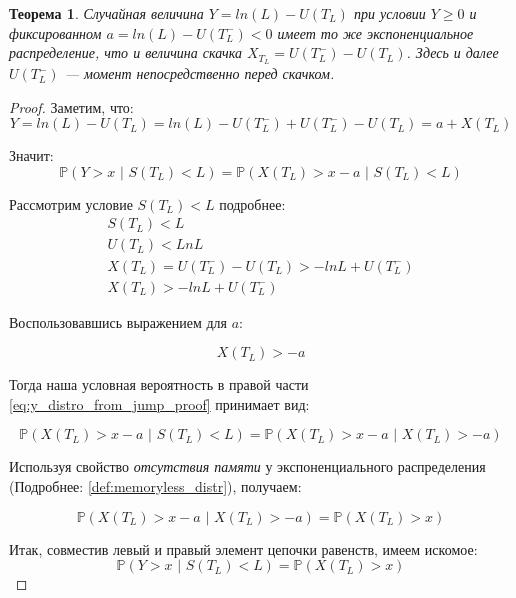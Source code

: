 \documentclass[a4paper,12pt]{article}
\newtheorem{theorem}{Теорема}
\theoremstyle{definition}
\begin{document}
\begin{theorem}
Случайная величина $Y=ln(L) - U(T_L)$ при условии $Y \ge 0$ и фиксированном $a = ln(L) - U(T_L^{-}) < 0$ имеет то же экспоненциальное распределение, что и величина скачка $X_{T_L}=U(T_L^{-})-U(T_L)$. Здесь и далее $U(T_L^{-})$ --- момент непосредственно перед скачком.
\end{theorem}
\begin{proof}
Заметим, что:
\begin{equation*}
    Y = ln(L) - U(T_L) = ln(L) - U(T_L^{-}) + U(T_L^{-}) - U(T_L) = a + X(T_L)
\end{equation*}

Значит:
\begin{equation}\label{eq:y_distro_from_jump_proof}
    \mathbb{P}(Y > x \text{ | } S(T_L) < L) = \mathbb{P}(X(T_L) > x - a \text{ | } S(T_L) < L)
\end{equation}

Рассмотрим условие $S(T_L) < L$ подробнее:
\begin{gather*}
    S(T_L) < L \\
    U(T_L) < Ln L \\
    X(T_L) = U(T_L^{-}) - U(T_L) > -ln L + U(T_L^{-}) \\
    X(T_L) > - ln L + U(T_L^{-})
\end{gather*}

Воспользовавшись выражением для $a$:

\begin{equation*}
    X(T_L) > -a
\end{equation*}

Тогда наша условная вероятность в правой части \eqref{eq:y_distro_from_jump_proof} принимает вид:

\begin{equation*}
    \mathbb{P}(X(T_L) > x - a \text{ | } S(T_L) < L) = \mathbb{P}(X(T_L) > x - a \text{ | } X(T_L) > -a)
\end{equation*}

Используя свойство \textit{отсутствия памяти} у экспоненциального распределения (Подробнее: \ref{def:memoryless_distr}), получаем:

\begin{equation*}
    \mathbb{P}(X(T_L) > x - a \text{ | } X(T_L) > -a) = \mathbb{P}(X(T_L) > x)
\end{equation*}

Итак, совместив левый и правый элемент цепочки равенств, имеем искомое:
\begin{equation}\label{eq:y_distro_from_jump}
    \mathbb{P}(Y > x \text{ | } S(T_L) < L) = \mathbb{P}(X(T_L) > x)
\end{equation}

\end{proof}
\end{document}
